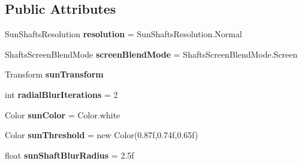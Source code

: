 \subsection*{Public Attributes}
\begin{DoxyCompactItemize}
\item 
Sun\+Shafts\+Resolution {\bfseries resolution} = Sun\+Shafts\+Resolution.\+Normal\hypertarget{class_unity_standard_assets_1_1_image_effects_1_1_sun_shafts_ac4e64d63f2b6f76426ab12a22fc36e3d}{}\label{class_unity_standard_assets_1_1_image_effects_1_1_sun_shafts_ac4e64d63f2b6f76426ab12a22fc36e3d}

\item 
Shafts\+Screen\+Blend\+Mode {\bfseries screen\+Blend\+Mode} = Shafts\+Screen\+Blend\+Mode.\+Screen\hypertarget{class_unity_standard_assets_1_1_image_effects_1_1_sun_shafts_ae054ab3f41db3cba79a0ff345f80f9d7}{}\label{class_unity_standard_assets_1_1_image_effects_1_1_sun_shafts_ae054ab3f41db3cba79a0ff345f80f9d7}

\item 
Transform {\bfseries sun\+Transform}\hypertarget{class_unity_standard_assets_1_1_image_effects_1_1_sun_shafts_a6eb95c417919671b17ca5d0479c75b65}{}\label{class_unity_standard_assets_1_1_image_effects_1_1_sun_shafts_a6eb95c417919671b17ca5d0479c75b65}

\item 
int {\bfseries radial\+Blur\+Iterations} = 2\hypertarget{class_unity_standard_assets_1_1_image_effects_1_1_sun_shafts_adbae1dcf55616fe0222523185cb6f41d}{}\label{class_unity_standard_assets_1_1_image_effects_1_1_sun_shafts_adbae1dcf55616fe0222523185cb6f41d}

\item 
Color {\bfseries sun\+Color} = Color.\+white\hypertarget{class_unity_standard_assets_1_1_image_effects_1_1_sun_shafts_ab1b244b1a4c8df374cc015ba7c63609e}{}\label{class_unity_standard_assets_1_1_image_effects_1_1_sun_shafts_ab1b244b1a4c8df374cc015ba7c63609e}

\item 
Color {\bfseries sun\+Threshold} = new Color(0.\+87f,0.\+74f,0.\+65f)\hypertarget{class_unity_standard_assets_1_1_image_effects_1_1_sun_shafts_aada48bd4fbde58529c22ba3907e772bf}{}\label{class_unity_standard_assets_1_1_image_effects_1_1_sun_shafts_aada48bd4fbde58529c22ba3907e772bf}

\item 
float {\bfseries sun\+Shaft\+Blur\+Radius} = 2.\+5f\hypertarget{class_unity_standard_assets_1_1_image_effects_1_1_sun_shafts_a8bb5bab9e0ec911869fe77ccf5566d34}{}\label{class_unity_standard_assets_1_1_image_effects_1_1_sun_shafts_a8bb5bab9e0ec911869fe77ccf5566d34}


\end{DoxyCompactItemize}
